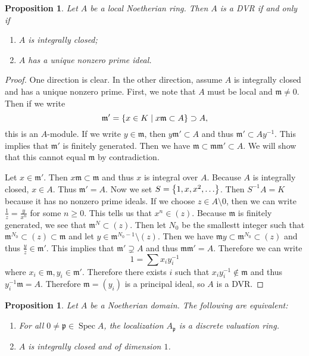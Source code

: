 \documentclass[leqno, openany]{memoir}
\newtheorem{prop}[thm]{Proposition}
\theoremstyle{definition}
\theoremstyle{remark}
\theoremstyle{plain}
\theoremstyle{definition}
\theoremstyle{remark}
\newcommand{\mf}[1]{\mathfrak{#1}}
\DeclareMathOperator{\Spec}{Spec}
\begin{document}
\begin{prop} Let $A$ be a local Noetherian ring. Then $A$ is a DVR if and only
if \begin{enumerate} \item $A$ is integrally closed; \item $A$ has a unique
nonzero prime ideal.  \end{enumerate} \end{prop}

\begin{proof} One direction is clear. In the other direction, assume $A$ is
    integrally closed and has a unique nonzero prime. First, we note that $A$
    must be local and $\mf{m} \neq 0$. Then if we write \[ \mf{m}' = \qty{x \in
    K \mid x \mf{m} \subset A} \supset A, \] this is an $A$-module. If we write
    $y \in \mf{m}$, then $y \mf{m}' \subset A$ and thus $\mf{m}' \subset
    Ay^{-1}$. This implies that $\mf{m}'$ is finitely generated. Then we have
    $\mf{m} \subset \mf{m} \mf{m}' \subset A$. We will show that this cannot
    equal $\mf{m}$ by contradiction. 

    Let $x \in \mf{m}'$. Then $x \mf{m} \subset \mf{m}$ and thus $x$ is
    integral over $A$. Because $A$ is integrally closed, $x \in A$. Thus
    $\mf{m}' = A$. Now we set $S = \qty{1, x, x^2, \ldots}$. Then $S^{-1}A = K$
    because it has no nonzero prime ideals. If we choose $z \in A \setminus 0$,
    then we can write $\frac{1}{z} = \frac{y}{x^n}$ for some $n \geq 0$. This
    tells us that $x^n \in (z)$. Because $\mf{m}$ is finitely generated, we see
    that $\mf{m}^N \subset (z)$. Then let $N_0$ be the smallestt integer such
    that $\mf{m}^{N_0} \subset (z) \subset \mf{m}$ and let $y \in \mf{m}^{N_0 -
    1} \setminus (z)$. Then we have $\mf{m}y \subset \mf{m}^{N_0} \subset (z)$
    and thus $\frac{y}{z} \in \mf{m}'$. This implies that $\mf{m}' \supsetneq
    A$ and thus $\mf{m} \mf{m}' = A$. Therefore we can write \[ 1 = \sum x_i
    y_i^{-1} \] where $x_i \in \mf{m}, y_i \in \mf{m}'$. Therefore there exists
$i$ such that $x_i y_i^{-1} \notin \mf{m}$ and thus $y_i^{-1} \mf{m} = A$.
Therefore $\mf{m} = (y_i)$ is a principal ideal, so $A$ is a DVR.  \end{proof}

\begin{prop} Let $A$ be a Noetherian domain. The following are equivalent:
    \begin{enumerate} \item For all $0 \neq \mf{p} \in \Spec A$, the
        localization $A_{\mf{p}}$ is a discrete valuation ring.  \item $A$ is
        integrally closed and of dimension $1$.  \end{enumerate} \end{prop}
\end{document}
